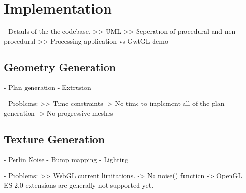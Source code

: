 \chapter{Implementation}

 - Details of the the codebase.
    >> UML
    >> Seperation of procedural and non-procedural
    >> Processing application vs GwtGL demo

\section{Geometry Generation}

 - Plan generation
 - Extrusion

 - Problems:
    >> Time constraints
        -> No time to implement all of the plan generation
        -> No progressive meshes

\section{Texture Generation}
 - Perlin Noise
 - Bump mapping
 - Lighting

 - Problems:
    >> WebGL current limitations.
        -> No noise() function
        -> OpenGL ES 2.0 extensions are generally not supported yet.
